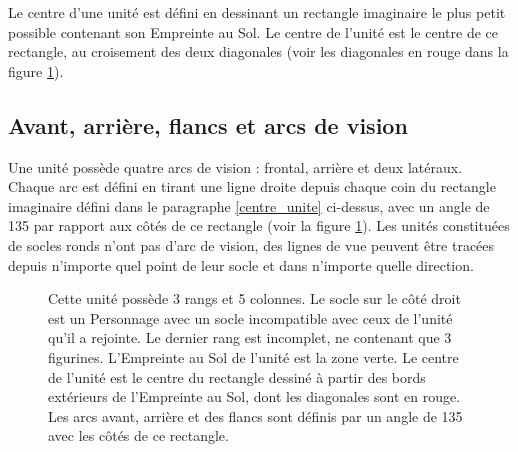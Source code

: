 Le centre d'une unité est défini en dessinant un rectangle imaginaire le plus petit possible contenant son Empreinte au Sol. Le centre de l'unité est le centre de ce rectangle, au croisement des deux diagonales (voir les diagonales en rouge dans la figure \ref{figure/arcs}).

\subsection{Avant, arrière, flancs et arcs de vision}

Une unité possède quatre arcs de vision : frontal, arrière et deux latéraux. Chaque arc est défini en tirant une ligne droite depuis chaque coin du rectangle imaginaire défini dans le paragraphe \ref{centre_unite} ci-dessus, avec un angle de 135{\text{\degree}} par rapport aux côtés de ce rectangle (voir la figure \ref{figure/arcs}). Les unités constituées de socles ronds n'ont pas d'arc de vision, des lignes de vue peuvent être tracées depuis n'importe quel point de leur socle et dans n'importe quelle direction.

\newcommand{\frontarc}{Arc frontal}
\newcommand{\leftsidearc}{Arc latéral}
\newcommand{\rightsidearc}{Arc latéral}
\newcommand{\reararc}{Arc arrière}
\newcommand{\centreofunit}{\normalfontsize Centre de l'unité}
\newcommand{\firstangle}{90 \text{\degree}}
\newcommand{\secondangle}{135 \text{\degree}}
\begin{figure}[!htbp]
\begin{minipage}[c]{0.65\textwidth}
\def\svgwidth{\textwidth}

\end{minipage}\hfill
\begin{minipage}[c]{0.32\textwidth}
\caption{Cette unité possède 3 rangs et 5 colonnes. Le socle sur le côté droit est un Personnage avec un socle incompatible avec ceux de l'unité qu'il a rejointe. Le dernier rang est incomplet, ne contenant que 3 figurines. L'Empreinte au Sol de l'unité est la zone verte. Le centre de l'unité est le centre du rectangle dessiné à partir des bords extérieurs de l'Empreinte au Sol, dont les diagonales sont en rouge. Les arcs avant, arrière et des flancs sont définis par un angle de 135{\text{\degree}} avec les côtés de ce rectangle.}
\label{figure/arcs}
\end{minipage}
\end{figure}
